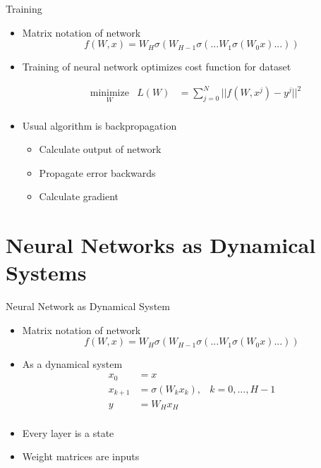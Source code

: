 \documentclass[11pt,t]{beamer}
\begin{document}
\begin{frame}{Training}
   \begin{itemize}
      \item Matrix notation of network
      \begin{equation*}
         f(W,x) = W_H\sigma(W_{H-1}\sigma(...W_1\sigma(W_0x)...))
      \end{equation*}
      \item Training of neural network optimizes cost function for dataset

      \begin{equation*}
      \begin{aligned}
      & \underset{W}{\text{minimize}}
      & L(W) &= \sum\limits_{j=0}^{N}||f(W,x^j) - y^j||^2 \\
      \end{aligned}
      \end{equation*}

      \item Usual algorithm is backpropagation
      
      \begin{itemize}
         \item Calculate output of network
         \item Propagate error backwards
         \item Calculate gradient
      \end{itemize}
   \end{itemize}
\end{frame}

\section{Neural Networks as Dynamical Systems}

\begin{frame}{Neural Network as Dynamical System}
   \begin{itemize}
      \item Matrix notation of network
      \begin{equation*}
         f(W,x) = W_H\sigma(W_{H-1}\sigma(...W_1\sigma(W_0x)...))
      \end{equation*}


      \item As a dynamical system
      \begin{equation*}
      \begin{aligned}
      x_0 &= x \\
      x_{k+1} &= \sigma(W_kx_k), & k = 0,...,H-1 \\
      y &= W_Hx_H \\
      \end{aligned}
      \end{equation*}
      \item Every layer is a state
      \item Weight matrices are inputs


   \end{itemize}
\end{frame}
\end{document}
